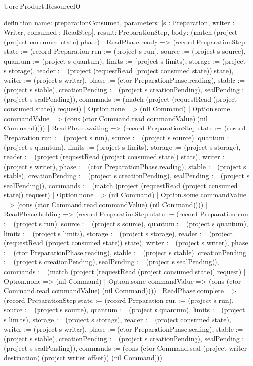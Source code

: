 \begin{lexlean}{Uorc.Product.ResourceIO}
\begin{semanticmodule}
definition{
  name: preparationConsumed,
  parameters: [s : Preparation, writer : Writer, consumed : ReadStep],
  result: PreparationStep,
  body: (match (project (project consumed state) phase)
    | ReadPhase.ready => (record PreparationStep {state := (record Preparation {run := (project s run), source := (project s source), quantum := (project s quantum), limits := (project s limits), storage := (project s storage), reader := (project (requestRead (project consumed state)) state), writer := (project s writer), phase := (ctor PreparationPhase.reading), stable := (project s stable), creationPending := (project s creationPending), sealPending := (project s sealPending)}), commands := (match (project (requestRead (project consumed state)) request)
      | Option.none => (nil Command)
      | Option.some commandValue => (cons (ctor Command.read commandValue) (nil Command)))})
    | ReadPhase.waiting => (record PreparationStep {state := (record Preparation {run := (project s run), source := (project s source), quantum := (project s quantum), limits := (project s limits), storage := (project s storage), reader := (project (requestRead (project consumed state)) state), writer := (project s writer), phase := (ctor PreparationPhase.reading), stable := (project s stable), creationPending := (project s creationPending), sealPending := (project s sealPending)}), commands := (match (project (requestRead (project consumed state)) request)
      | Option.none => (nil Command)
      | Option.some commandValue => (cons (ctor Command.read commandValue) (nil Command)))})
    | ReadPhase.holding => (record PreparationStep {state := (record Preparation {run := (project s run), source := (project s source), quantum := (project s quantum), limits := (project s limits), storage := (project s storage), reader := (project (requestRead (project consumed state)) state), writer := (project s writer), phase := (ctor PreparationPhase.reading), stable := (project s stable), creationPending := (project s creationPending), sealPending := (project s sealPending)}), commands := (match (project (requestRead (project consumed state)) request)
      | Option.none => (nil Command)
      | Option.some commandValue => (cons (ctor Command.read commandValue) (nil Command)))})
    | ReadPhase.complete => (record PreparationStep {state := (record Preparation {run := (project s run), source := (project s source), quantum := (project s quantum), limits := (project s limits), storage := (project s storage), reader := (project consumed state), writer := (project s writer), phase := (ctor PreparationPhase.sealing), stable := (project s stable), creationPending := (project s creationPending), sealPending := (project s sealPending)}), commands := (cons (ctor Command.seal (project writer destination) (project writer offset)) (nil Command))})
}
\end{semanticmodule}
\end{lexlean}
